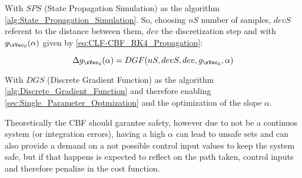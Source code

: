 With \(SPS\) (State Propagation Simulation) as the algorithm \ref{alg:State_Propagation_Simulation}. So, choosing \(nS\) number of samples, \(devS\) referent to the distance between them, \(dev\) the discretization step and with \(g_{\xVec_0}(\alpha)\) given by \ref{eq:CLF-CBF_RK4_Propagation}:

\begin{equation}
    \Delta g_{\xVec_0}(\alpha) = DGF(nS,devS,dev, g_{\xVec_0},\alpha)  
    \label{discrete_gradient_function}
\end{equation}

With \(DGS\) (Discrete Gradient Function) as the algorithm \ref{alg:Discrete_Gradient_Function}  and therefore enabling \ref{sec:Single_Parameter_Optmization} and the optimization of the slope \(\alpha\).\par  
Theoretically the CBF should garantee safety, however due to not be a continuos system (or integration errors), having a high \(\alpha\) can lead to unsafe sets and can also provide a demand on a not possible control input values to keep the system safe, but if that happens is expected to reflect on the path taken, control inputs and therefore penalize in the cost function.


\subsection{}
\label{subsec:CLFs_Summed_Algorithm}







\subsection{}
\label{subsec:CLFs_Unified_Algorithm}


































